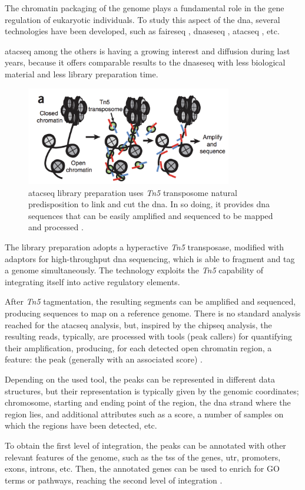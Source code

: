 The chromatin packaging of the genome plays a fundamental role in the gene regulation of eukaryotic individuals.
To study this aspect of the \gls{dna}, several technologies have been developed, such as \gls{faireseq} \cite{Giresi2007}, \gls{dnaseseq} \cite{Winter2013}, \gls{atacseq} \cite{Buenrostro2013}, etc.

\gls{atacseq} among the others is having a growing interest and diffusion during last years, because it offers comparable results to the \gls{dnaseseq} with less biological material and less library preparation time.

\begin{figure}[h]
\centering
\includegraphics[width=9cm,keepaspectratio]{img/intro/atac.png}
\caption[\gls{atacseq} experiment]{\gls{atacseq} library preparation uses \textit{Tn5} transposome natural predisposition to link and cut the \gls{dna}. In so doing, it provides \gls{dna} sequences that can be easily amplified and sequenced to be mapped and processed \cite{Buenrostro2013}.}
\label{fig:atacseqexp}
\end{figure}

The library preparation adopts a hyperactive \textit{Tn5} transposase, modified with adaptors for high-throughput  \gls{dna} sequencing, which is able to fragment and tag a genome simultaneously.
The technology exploits the \textit{Tn5} capability of integrating itself into active regulatory elements.

After \textit{Tn5} tagmentation, the resulting segments can be amplified and sequenced, producing sequences to map on a reference genome.
There is no standard analysis reached for the \gls{atacseq} analysis, but, inspired by the \gls{chipseq} analysis, the resulting reads, typically, are processed with tools (peak callers) for quantifying their amplification, producing, for each detected open chromatin region, a feature: the peak (generally with an associated score) \cite{Wei2018}.

Depending on the used tool, the peaks can be represented in different data structures, but their representation is typically given by the genomic coordinates; chromosome, starting and ending point of the region, the \gls{dna} strand where the region lies, and additional attributes such as a score, a number of samples on which the regions have been detected, etc.

To obtain the first level of integration, the peaks can be annotated with other relevant features of the genome, such as the \gls{tss} of the genes, \gls{utr}, promoters, exons, introns, etc.  
Then, the annotated genes can be used to enrich for GO terms or pathways, reaching the second level of integration \cite{righelli2018, Koberstein2018, Ou2018}.




